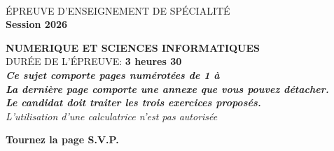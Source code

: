 \pagestyle{empty}

\NomPrenom{}

\vspace{1cm}

\begin{center}
\\
\vspace{3cm}
{\Large \'EPREUVE D'ENSEIGNEMENT DE SP\'ECIALIT\'E}\\
\vspace{3cm}\Large\bf{Session 2026}\\
\vspace{2cm}

{\LARGE {\bf NUMERIQUE ET SCIENCES INFORMATIQUES}}\\
\vspace{1.5cm}
\vspace{1.5cm}
DUR\'EE DE L'\'EPREUVE: {\bf 3 heures 30} \\
\vspace{2cm}
{\bf {\it Ce sujet comporte \pageref{LastPage} pages numérotées de 1 à \pageref{LastPage}}}\\
{\bf {\it La dernière page comporte une annexe que vous pouvez détacher.}}\\
{\bf {\it Le candidat doit traiter les trois exercices proposés.}}\\
   \vspace{1.5cm}
{\it L'utilisation d'une calculatrice n'est pas autorisée}\\
\vspace{1.5cm}
\end{center}
\vfill
\hfill {\bf Tournez la page S.V.P.}
